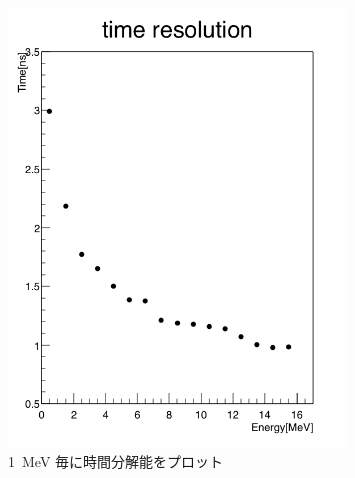 \begin{figure}[H]
\begin{minipage}{0.5\hsize}
\includegraphics[width  = 0.8\textwidth]{figure/mino/timeresolution_ratio.png}
\caption{1~MeV 毎に時間分解能をプロット}
\label{fig:NaI_peak_time_resolution}
\end{minipage}
\end{figure}


